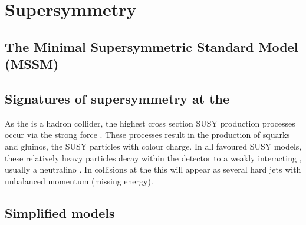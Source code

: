 



\section{Supersymmetry}
\label{sec:susy}




\subsection{The Minimal Supersymmetric Standard Model (MSSM)}

\subsection{Signatures of supersymmetry at the \LHC}

As the \LHC is a hadron collider, the highest cross section SUSY
production processes occur via the strong force
\cite{Martin:1997ns}
\cite{SUSYxsections_NewAspectsof_pp_collisions}. These processes
result in the production of squarks and gluinos, the SUSY particles
with colour charge. In all favoured SUSY models, these relatively
heavy particles decay within the detector to a weakly interacting \LSP,
usually a neutralino \cite{Farrar:1978xj}. In
collisions at the \LHC this will appear as several hard jets with
unbalanced momentum (missing energy). 

\subsection{Simplified models}


